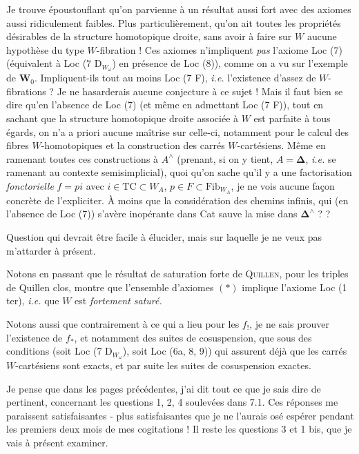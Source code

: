 Je trouve époustouflant qu'on parvienne à un résultat aussi fort avec des axiomes aussi ridiculement faibles. Plus particulièrement, qu'on ait toutes les propriétés désirables de la structure homotopique droite, sans avoir à faire sur $W$ aucune hypothèse du type $W$-fibration ! Ces axiomes n'impliquent \textit{pas} l'axiome Loc (7) (équivalent à Loc (7 $\mathrm{D}_{W_\omega}$) en présence de Loc (8)), comme on a vu sur l'exemple de $\mathbf{W}_0$. Impliquent-ils tout au moins Loc (7 F), \textit{i.e.} l'existence d'assez de $W$-fibrations ? Je ne hasarderais aucune conjecture à ce sujet ! Mais il faut bien se dire qu'en l'absence de Loc (7) (et même
en admettant Loc (7 F)), tout en sachant que la structure homotopique droite associée à $W$ est parfaite à tous égards, on n'a a priori aucune maîtrise sur celle-ci, notamment pour le calcul des fibres $W$-homotopiques et la construction des carrés $W$-cartésiens. Même en ramenant toutes ces constructions à $A^\wedge$ (prenant, si on y tient, $A = \boldsymbol{\Delta}$, \textit{i.e.} se ramenant au contexte semisimplicial), quoi qu'on sache qu'il y a une factorisation \textit{fonctorielle} $f = pi$ avec $i \in \mathrm{TC} \subset W_A$, $p \in F \subset \mathrm{Fib}_{W_A}$, je ne vois aucune façon concrète de l'expliciter. À moins que la considération des chemins infinis, qui (en l'absence de Loc (7)) s'avère inopérante dans Cat sauve la mise dans $\boldsymbol{\Delta}^\wedge$ ? ?

Question qui devrait être facile à élucider, mais sur laquelle je ne veux pas m'attarder à présent.

Notons en passant que le résultat de saturation forte de \textsc{Quillen}, pour les triples de Quillen clos, montre que l'ensemble d'axiomes $(*)$ implique l'axiome Loc (1 ter), \textit{i.e.} que $W$ est \textit{fortement saturé.}

Notons aussi que contrairement à ce qui a lieu pour les $f_!$, je ne sais prouver l'existence de $f_*$, et notamment des suites de cosuspension, que sous des conditions (soit Loc (7 $\mathrm{D}_{W_\omega}$), soit Loc (6a, 8, 9)) qui assurent déjà que les carrés $W$-cartésiens sont exacts, et par suite les suites de cosuspension exactes.

Je pense que dans les pages précédentes, j'ai dit tout ce que je sais dire de pertinent, concernant les questions 1, 2, 4 soulevées dans 7.1. Ces réponses me paraissent satisfaisantes - plus satisfaisantes que je ne l'aurais osé espérer pendant les premiers deux mois de mes cogitations ! Il reste les questions 3 et 1 bis, que je vais à présent examiner.

